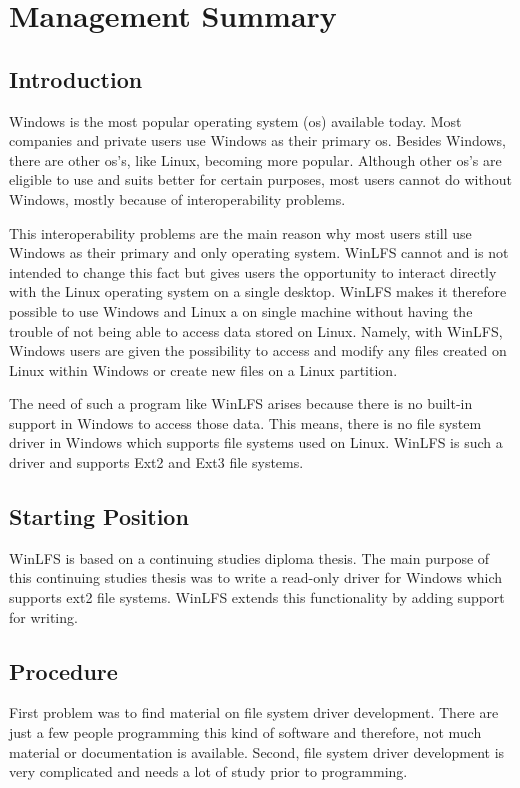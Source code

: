 \chapter*{Management Summary}
\setcounter{page}{4}

\section*{Introduction}
Windows is the most popular operating system (os) available today. Most companies and private users use Windows as their primary os. Besides Windows, there are other os's, like Linux, becoming more popular. Although other os's are eligible to use and suits better for certain purposes, most users cannot do without Windows, mostly because of interoperability problems.

This interoperability problems are the main reason why most users still use Windows as their primary and only operating system. WinLFS cannot and is not intended to change this fact but gives users the opportunity to interact directly with the Linux operating system on a single desktop. WinLFS makes it therefore possible to use Windows and Linux a on single machine without having the trouble of not being able to access data stored on Linux. Namely, with WinLFS, Windows users are given the possibility to access and modify any files created on Linux within Windows or create new files on a Linux partition.

The need of such a program like WinLFS arises because there is no built-in support in Windows to access those data. This means, there is no file system driver in Windows which supports file systems used on Linux. WinLFS is such a driver and supports Ext2 and Ext3 file systems.

\section*{Starting Position}
WinLFS is based on a continuing studies diploma thesis. The main purpose of this continuing studies thesis was to write a read-only driver for Windows which supports ext2 file systems. WinLFS extends this functionality by adding support for writing.

\section*{Procedure}
First problem was to find material on file system driver development. There are just a few people programming this kind of software and therefore, not much material or documentation is available. Second, file system driver development is very complicated and needs a lot of study prior to programming.

